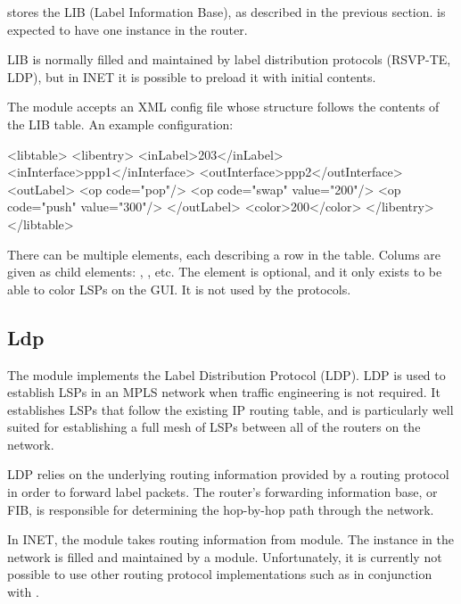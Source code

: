  stores the LIB (Label Information Base), as described
in the previous section.  is expected to have one instance
in the router.

LIB is normally filled and maintained by label distribution protocols (RSVP-TE,
LDP), but in INET it is possible to preload it with initial contents.

The  module accepts an XML config file whose structure
follows the contents of the LIB table. An example configuration:

\begin{XML}
<libtable>
    <libentry>
        <inLabel>203</inLabel>
        <inInterface>ppp1</inInterface>
        <outInterface>ppp2</outInterface>
        <outLabel>
            <op code="pop"/>
            <op code="swap" value="200"/>
            <op code="push" value="300"/>
        </outLabel>
        <color>200</color>
    </libentry>
</libtable>
\end{XML}

There can be multiple  elements, each describing a row in the
table. Colums are given as child elements: , ,
etc. The  element is optional, and it only exists to be able to
color LSPs on the GUI. It is not used by the protocols.

\subsection{Ldp}
\label{sec:mpls:ldp}

The  module implements the Label Distribution Protocol (LDP).
LDP is used to establish LSPs in an MPLS network when traffic engineering is not
required. It establishes LSPs that follow the existing IP routing table, and is
particularly well suited for establishing a full mesh of LSPs between all of the
routers on the network.

LDP relies on the underlying routing information provided by a routing protocol
in order to forward label packets. The router's forwarding information base, or
FIB, is responsible for determining the hop-by-hop path through the network.

In INET, the  module takes routing information from 
module. The  instance in the network is filled and maintained
by a  module. Unfortunately, it is currently not
possible to use other routing protocol implementations such as 
in conjunction with .


